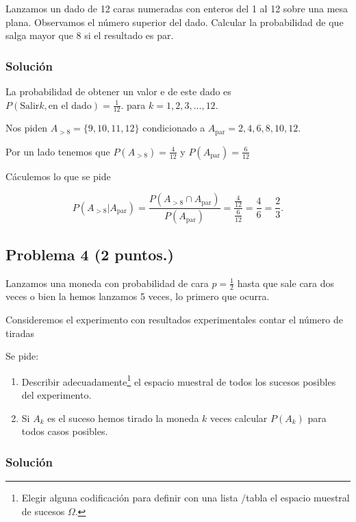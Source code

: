 \documentclass[
]{article}
\providecommand{\tightlist}{%
  \setlength{\itemsep}{0pt}\setlength{\parskip}{0pt}}
\begin{document}
Lanzamos un dado de 12 caras numeradas con enteros del 1 al 12 sobre una
mesa plana. Observamos el número superior del dado. Calcular la
probabilidad de que salga mayor que 8 si el resultado es par.

\hypertarget{soluciuxf3n-2}{%
\subsubsection{Solución}\label{soluciuxf3n-2}}

La probabilidad de obtener un valor e de este dado es
\(P(\mbox{Salir} k ,\mbox{en el dado})=\frac{1}{12}.\) para
\(k=1,2,3,\ldots,12.\)

Nos piden \(A_{> 8}=\{9,10,11,12\}\) condicionado a
\(A_{\mbox{par}}={2,4,6,8,10,12}\).

Por un lado tenemos que \(P(A_{> 8})=\frac{4}{12}\) y
\(P(A_{\mbox{par}})=\frac{6}{12}\)

Cáculemos lo que se pide

\[
P\left(A_{> 8}| A_{\mbox{par}}\right)=
\frac{ P\left(A_{> 8}\cap A_{\mbox{par}}\right)}{P\left(A_{\mbox{par}}\right)}=
\frac{\frac{4}{12}}{\frac{6}{12}}=\frac{4}{6}=\frac{2}{3}.
\]

\hypertarget{problema-4}{%
\subsection{\texorpdfstring{Problema 4
(\textbf{2 puntos.})}{Problema 4 ()}}\label{problema-4}}

Lanzamos una moneda con probabilidad de cara \(p=\frac{1}{2}\) hasta que
sale cara dos veces o bien la hemos lanzamos 5 veces, lo primero que
ocurra.

Consideremos el experimento con resultados experimentales contar el
número de tiradas

Se pide:

\begin{enumerate}
\def\labelenumi{\alph{enumi}.}
\tightlist
\item
  Describir
  adecuadamente\footnote{Elegir alguna codificación para definir con una lista /tabla el espacio muestral de sucesos $\Omega$.}
  el espacio muestral de todos los sucesos posibles del experimento.
\item
  Si \(A_k\) es el suceso hemos tirado la moneda \(k\) veces calcular
  \(P(A_k)\) para todos casos posibles.
\end{enumerate}

\hypertarget{soluciuxf3n-3}{%
\subsubsection{Solución}\label{soluciuxf3n-3}}
\end{document}
